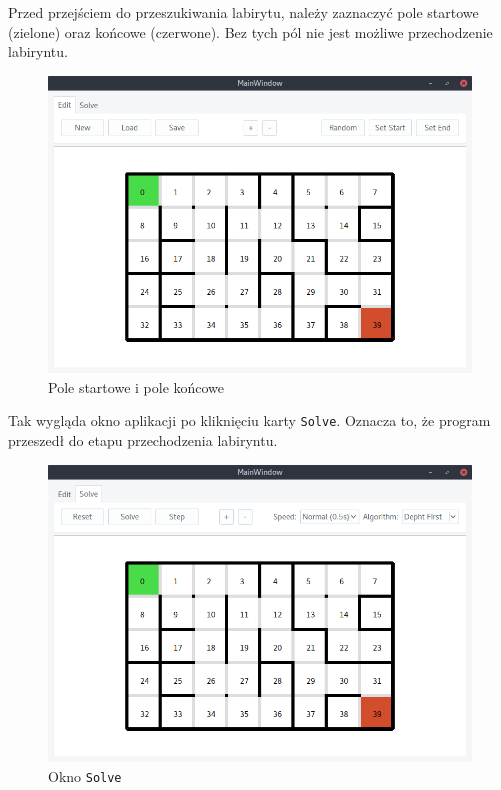 \documentclass[12pt,a4paper]{article}
\begin{document}
	Przed przejściem do przeszukiwania labirytu, należy zaznaczyć
	pole startowe (zielone) oraz końcowe (czerwone). Bez tych pól
	nie jest możliwe przechodzenie labiryntu.
	\begin{figure}[H]
		\centering
		\includegraphics[width=0.8\linewidth]{obrazki/4.png}
		\caption{Pole startowe i pole końcowe}
	\end{figure}
	
	Tak wygląda okno aplikacji po kliknięciu karty \texttt{Solve}.
	Oznacza to, że program przeszedł do etapu przechodzenia labiryntu.
	\begin{figure}[H]
		\centering
		\includegraphics[width=0.8\linewidth]{obrazki/5.png}
		\caption{Okno \texttt{Solve}}
	\end{figure}
	
\end{document}
